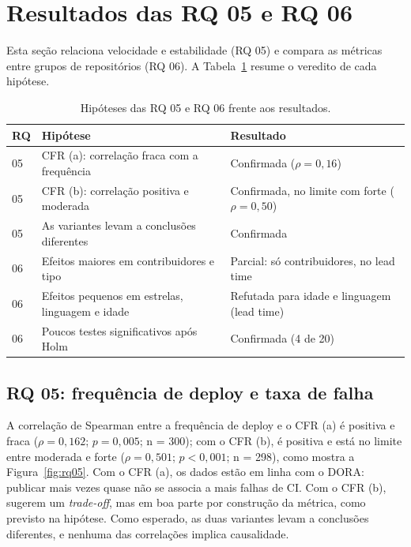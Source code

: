 \section{Resultados das RQ 05 e RQ 06}

Esta seção relaciona velocidade e estabilidade (RQ 05) e compara as métricas entre grupos de repositórios (RQ 06). A Tabela~\ref{tab:hipoteses_rq05_rq06} resume o veredito de cada hipótese.

\begin{table}[ht]
\centering
\footnotesize
\caption{Hipóteses das RQ 05 e RQ 06 frente aos resultados.}
\label{tab:hipoteses_rq05_rq06}
\begin{tabular}{p{}p{}p{}}
\hline
RQ & Hipótese & Resultado \\
\hline
05 & CFR (a): correlação fraca com a frequência & Confirmada ($\rho = 0{,}16$) \\
05 & CFR (b): correlação positiva e moderada & Confirmada, no limite com forte ($\rho = 0{,}50$) \\
05 & As variantes levam a conclusões diferentes & Confirmada \\
06 & Efeitos maiores em contribuidores e tipo & Parcial: só contribuidores, no lead time \\
06 & Efeitos pequenos em estrelas, linguagem e idade & Refutada para idade e linguagem (lead time) \\
06 & Poucos testes significativos após Holm & Confirmada (4 de 20) \\
\hline
\end{tabular}
\end{table}

\subsection{RQ 05: frequência de deploy e taxa de falha}

A correlação de Spearman entre a frequência de deploy e o CFR (a) é positiva e fraca ($\rho = 0{,}162$; $p = 0{,}005$; n = 300); com o CFR (b), é positiva e está no limite entre moderada e forte ($\rho = 0{,}501$; $p < 0{,}001$; n = 298), como mostra a Figura~\ref{fig:rq05}. Com o CFR (a), os dados estão em linha com o DORA: publicar mais vezes quase não se associa a mais falhas de CI. Com o CFR (b), sugerem um \textit{trade-off}, mas em boa parte por construção da métrica, como previsto na hipótese. Como esperado, as duas variantes levam a conclusões diferentes, e nenhuma das correlações implica causalidade.

